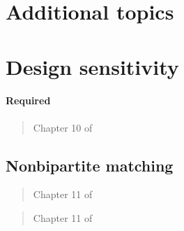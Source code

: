 \documentclass[12pt]{article}
\begin{document}
\section{Additional topics}

\section{Design sensitivity}

\paragraph*{Required}

\begin{verse}  \end{verse}

\begin{verse} Chapter 10 of  \end{verse}

\subsection{Nonbipartite matching}\label{sec:nbp}

\begin{verse} Chapter 11 of  \end{verse}

\begin{verse}  \end{verse}

\begin{verse} Chapter 11 of  \end{verse}

\begin{verse}  \end{verse}

\begin{verse}  \end{verse}

\begin{verse}  \end{verse}

\begin{verse}  \end{verse}
\begin{verse}  \end{verse}
\end{document}
